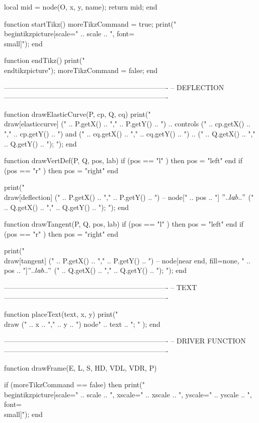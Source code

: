 \begin{luacode}
	local mid = node(O, x, y, name);
	return mid;
end

function startTikz()
	moreTikzCommand = true;
	print("\\begin{tikzpicture}[scale=" .. scale .. ", font=\\small]");
end

function endTikz()
	print("\\end{tikzpicture}");
	moreTikzCommand = false;
end

----------------------------------------------------------------------
-- DEFLECTION
----------------------------------------------------------------------

function drawElasticCurve(P, cp, Q, cq)
	print("\\draw[elasticcurve] (" .. P.getX() .. "," .. P.getY() .. ") .. controls (" .. cp.getX() .. "," .. cp.getY() .. ") and (" .. cq.getX() .. "," .. cq.getY() .. ") ..  (" .. Q.getX() .. "," .. Q.getY() .. "); ");
end

function drawVertDef(P, Q, pos, lab)
	if (pos == "l" ) then pos = "left" end
	if (pos == "r" ) then pos = "right" end
	
	print("\\draw[deflection] (" .. P.getX() .. "," .. P.getY() .. ") -- node[" .. pos .. "] {$" .. lab .. "$} (" .. Q.getX() .. "," .. Q.getY() .. "); ");
end

function drawTangent(P, Q, pos, lab)
	if (pos == "l" ) then pos = "left" end
	if (pos == "r" ) then pos = "right" end
	
	print("\\draw[tangent] (" .. P.getX() .. "," .. P.getY() .. ") -- node[near end, fill=none, " .. pos .. "]{$" .. lab .. "$} (" .. Q.getX() .. "," .. Q.getY() .. "); ");
end

----------------------------------------------------------------------
-- TEXT
----------------------------------------------------------------------

function placeText(text, x, y)
	print("\\draw (" .. x .. "," .. y .. ") node{" .. text .. "}; " );
end

----------------------------------------------------------------------
-- DRIVER FUNCTION
----------------------------------------------------------------------

function drawFrame(E, L, S, HD, VDL, VDR, P)
	
	if (moreTikzCommand == false) then
		print("\\begin{tikzpicture}[scale=" .. scale .. ", xscale=" .. xscale .. ", yscale=" .. yscale .. ", font=\\small]");
	end
		

\end{luacode}
